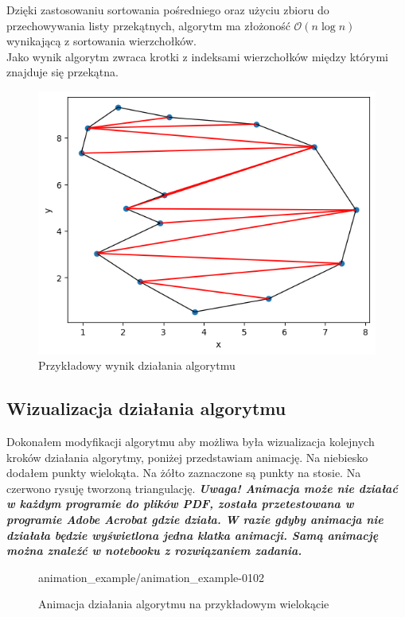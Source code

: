 \documentclass[a4paper]{article}
\begin{document}
    \noindent Dzięki zastosowaniu sortowania pośredniego oraz użyciu zbioru do przechowywania listy przekątnych,
    algorytm ma złożoność $\mathcal{O} (n \log n)$ wynikającą z sortowania wierzchołków.\\
    Jako wynik algorytm zwraca krotki z indeksami wierzchołków między którymi znajduje się przekątna.
    \begin{figure}[H]
        \centering
        \includegraphics{przykladowa_triangulacja.png}
        \caption{Przykładowy wynik działania algorytmu}
        \label{fig:example_triangulation}
    \end{figure}
    
    \pagebreak
    \subsection{Wizualizacja działania algorytmu}
    Dokonałem modyfikacji algorytmu aby możliwa była wizualizacja kolejnych kroków działania algorytmy, 
    poniżej przedstawiam animację. Na niebiesko dodałem punkty wielokąta. Na żółto zaznaczone są punkty 
    na stosie. Na czerwono rysuję tworzoną triangulację. \textbf{\textit{Uwaga! Animacja może nie działać w każdym
    programie do plików PDF, została przetestowana w programie Adobe Acrobat gdzie działa.
    W razie gdyby animacja nie działała będzie wyświetlona jedna klatka animacji. Samą 
    animację można znaleźć w notebooku z rozwiązaniem zadania.}}
    \begin{figure}[H]
        \centering
        {animation_example/animation_example-}{0}{102}
        \caption{Animacja działania algorytmu na przykładowym wielokącie}
        \label{fig:animation_of_triangulation}
    \end{figure}
    
\end{document}
